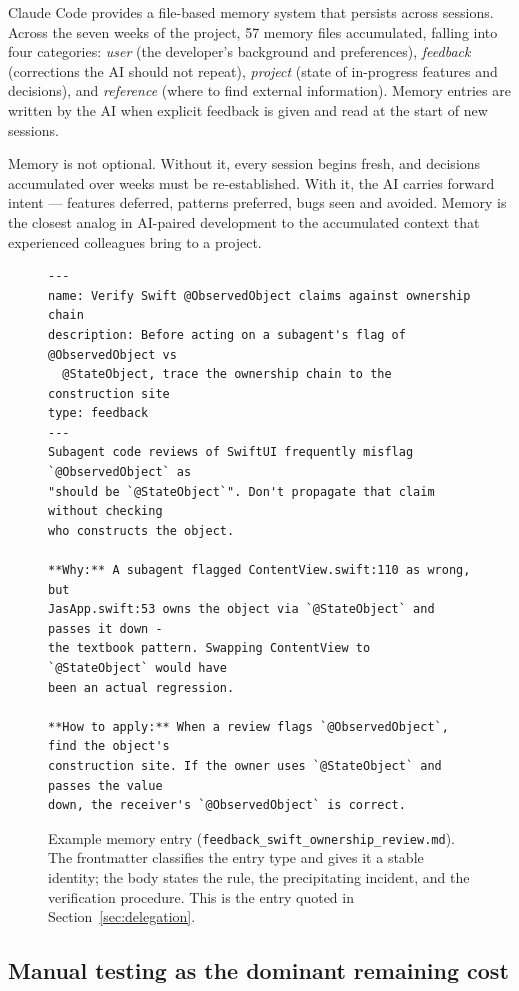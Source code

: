 \documentclass[10pt]{article}
\begin{document}
Claude Code provides a file-based memory system that persists across
sessions. Across the seven weeks of the project, 57 memory files
accumulated, falling into four categories: \emph{user} (the developer's
background and preferences), \emph{feedback} (corrections the AI should
not repeat), \emph{project} (state of in-progress features and decisions),
and \emph{reference} (where to find external information). Memory entries
are written by the AI when explicit feedback is given and read at the
start of new sessions.

Memory is not optional. Without it, every session begins fresh, and
decisions accumulated over weeks must be re-established. With it, the AI
carries forward intent --- features deferred, patterns preferred, bugs
seen and avoided. Memory is the closest analog in AI-paired development
to the accumulated context that experienced colleagues bring to a
project.

\begin{figure}[h]
\centering
\begin{lstlisting}
---
name: Verify Swift @ObservedObject claims against ownership chain
description: Before acting on a subagent's flag of @ObservedObject vs
  @StateObject, trace the ownership chain to the construction site
type: feedback
---
Subagent code reviews of SwiftUI frequently misflag `@ObservedObject` as
"should be `@StateObject`". Don't propagate that claim without checking
who constructs the object.

**Why:** A subagent flagged ContentView.swift:110 as wrong, but
JasApp.swift:53 owns the object via `@StateObject` and passes it down -
the textbook pattern. Swapping ContentView to `@StateObject` would have
been an actual regression.

**How to apply:** When a review flags `@ObservedObject`, find the object's
construction site. If the owner uses `@StateObject` and passes the value
down, the receiver's `@ObservedObject` is correct.
\end{lstlisting}
\caption{Example memory entry
(\texttt{feedback\_swift\_ownership\_review.md}). The frontmatter
classifies the entry type and gives it a stable identity; the body
states the rule, the precipitating incident, and the verification
procedure. This is the entry quoted in Section~\ref{sec:delegation}.}
\label{fig:memory}
\end{figure}

\subsection{Manual testing as the dominant remaining cost}
\end{document}
